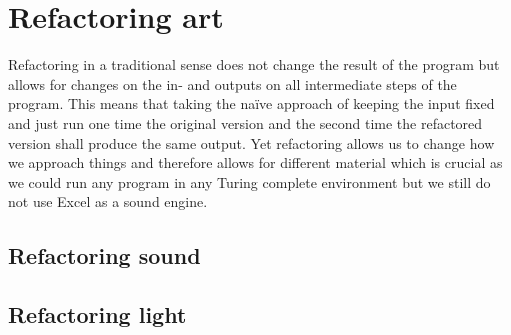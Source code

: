 \documentclass[10pt,twocolumn,letterpaper]{article}
\begin{document}
\section{Refactoring art}

Refactoring in a traditional sense does not change the result of the program but
allows for changes on the in- and outputs on all intermediate steps of the program.
This means that taking the naïve approach of keeping the input fixed and just run
one time the original version and the second time the refactored version shall produce
the same output.
Yet refactoring allows us to change how we approach things and therefore allows for different material
which is crucial as we could run any program in any Turing complete environment but
we still do not use Excel as a sound engine.

\subsection{Refactoring sound}

\subsection{Refactoring light}

{\small


}
\end{document}
